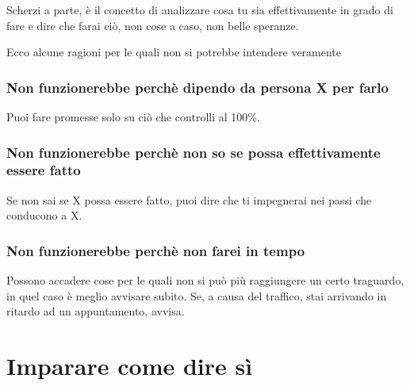 \documentclass[11pt,a4paper]{book}
\begin{document}
Scherzi a parte, è il concetto di analizzare cosa tu sia effettivamente in grado di fare e dire che farai ciò, non cose a caso, non belle speranze.

Ecco alcune ragioni per le quali non si potrebbe intendere veramente
\subsubsection{Non funzionerebbe perchè dipendo da persona X per farlo}
Puoi fare promesse solo su ciò che controlli al 100\%.

\subsubsection{Non funzionerebbe perchè non so se possa effettivamente essere fatto}
Se non sai se X possa essere fatto, puoi dire che ti impegnerai nei passi che conducono a X.

\subsubsection{Non funzionerebbe perchè non farei in tempo}
Possono accadere cose per le quali non si può più raggiungere un certo traguardo, in quel caso è meglio avvisare subito. Se, a causa del traffico, stai arrivando in ritardo ad un appuntamento, avvisa.

\section{Imparare come dire sì}
\end{document}
